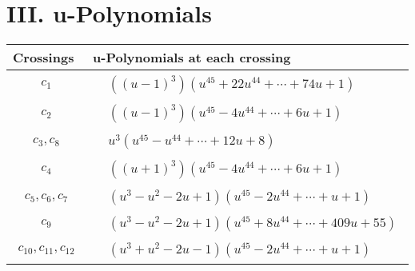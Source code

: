 \documentclass[1p]{elsarticle_modified}
\theoremstyle{definition}
\begin{document}
\newpage\renewcommand{\arraystretch}{1}
\centering \section*{ III. u-Polynomials}
\begin{tabular}{m{50pt}|m{274pt}}
Crossings & \hspace{64pt}u-Polynomials at each crossing \\
\hline $$\begin{aligned}c_{1}\end{aligned}$$&$\begin{aligned}
&((u-1)^3)(u^{45}+22 u^{44}+\cdots+74 u+1)
\end{aligned}$\\
\hline $$\begin{aligned}c_{2}\end{aligned}$$&$\begin{aligned}
&((u-1)^3)(u^{45}-4 u^{44}+\cdots+6 u+1)
\end{aligned}$\\
\hline $$\begin{aligned}c_{3},c_{8}\end{aligned}$$&$\begin{aligned}
&u^3(u^{45}- u^{44}+\cdots+12 u+8)
\end{aligned}$\\
\hline $$\begin{aligned}c_{4}\end{aligned}$$&$\begin{aligned}
&((u+1)^3)(u^{45}-4 u^{44}+\cdots+6 u+1)
\end{aligned}$\\
\hline $$\begin{aligned}c_{5},c_{6},c_{7}\end{aligned}$$&$\begin{aligned}
&(u^3- u^2-2 u+1)(u^{45}-2 u^{44}+\cdots+u+1)
\end{aligned}$\\
\hline $$\begin{aligned}c_{9}\end{aligned}$$&$\begin{aligned}
&(u^3- u^2-2 u+1)(u^{45}+8 u^{44}+\cdots+409 u+55)
\end{aligned}$\\
\hline $$\begin{aligned}c_{10},c_{11},c_{12}\end{aligned}$$&$\begin{aligned}
&(u^3+u^2-2 u-1)(u^{45}-2 u^{44}+\cdots+u+1)
\end{aligned}$\\
\hline
\end{tabular}\newpage\renewcommand{\arraystretch}{1}
\end{document}
